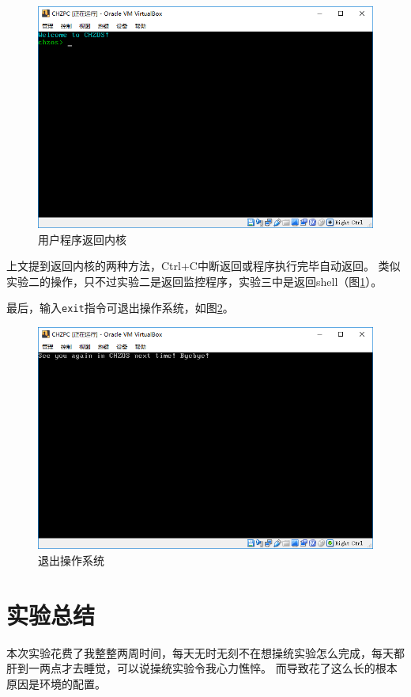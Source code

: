 \documentclass[logo,reportComp]{thesis}
\begin{document}
\begin{figure}[H]
\centering
\includegraphics[width=0.8\linewidth]{fig/return.PNG}
\caption{用户程序返回内核}
\label{fig:return}
\end{figure}

上文提到返回内核的两种方法，Ctrl+C中断返回或程序执行完毕自动返回。
类似实验二的操作，只不过实验二是返回监控程序，实验三中是返回shell（图\ref{fig:return}）。

最后，输入\verb'exit'指令可退出操作系统，如图\ref{fig:exit}。
\begin{figure}[H]
\centering
\includegraphics[width=0.8\linewidth]{fig/exit.PNG}
\caption{退出操作系统}
\label{fig:exit}
\end{figure}

\section{实验总结}

本次实验花费了我整整两周时间，每天无时无刻不在想操统实验怎么完成，每天都肝到一两点才去睡觉，可以说操统实验令我心力憔悴。
而导致花了这么长的根本原因是环境的配置。
\end{document}
